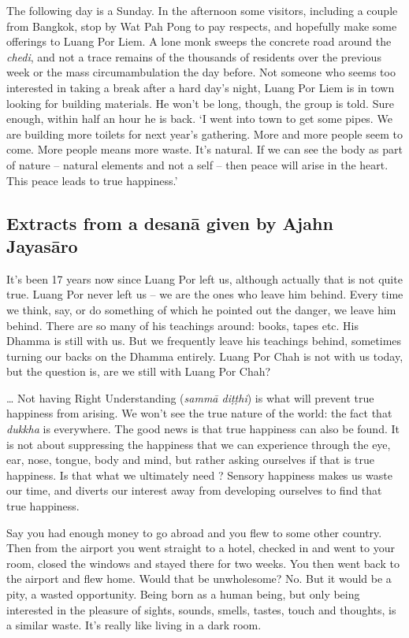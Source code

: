 The following day is a Sunday. In the afternoon some visitors, including
a couple from Bangkok, stop by Wat Pah Pong to pay respects, and
hopefully make some offerings to Luang Por Liem. A lone monk sweeps the
concrete road around the \emph{chedi}, and not a trace remains of the
thousands of residents over the previous week or the mass
circumambulation the day before. Not someone who seems too interested in
taking a break after a hard day's night, Luang Por Liem is in town
looking for building materials. He won't be long, though, the group is
told. Sure enough, within half an hour he is back. `I went into town to
get some pipes. We are building more toilets for next year's gathering. 
More and more people seem to come. More people means more waste. It's
natural. If we can see the body as part of nature -- natural elements
and not a self -- then peace will arise in the heart. This peace leads
to true happiness.'

\subsection*{Extracts from a desanā given by Ajahn Jayasāro}

It's been 17 years now since Luang Por left us, although actually
that is not quite true. Luang Por never left us -- we are the ones who
leave him behind. Every time we think, say, or do something of which he
pointed out the danger, we leave him behind. There are so many of his
teachings around: books, tapes etc. His Dhamma is still with us. But we
frequently leave his teachings behind, sometimes turning our backs on
the Dhamma entirely. Luang Por Chah is not with us today, but the
question is, are we still with Luang Por Chah? 

\ldots{} Not having Right Understanding (\emph{sammā diṭṭhi}) is what
will prevent true happiness from arising. We won't see the true nature
of the world: the fact that \emph{dukkha} is everywhere. The good news
is that true happiness can also be found. It is not about suppressing
the happiness that we can experience through the eye, ear, nose, tongue, 
body and mind, but rather asking ourselves if that is true happiness. Is
that what we ultimately need ? Sensory happiness makes us waste our time, 
and diverts our interest away from developing ourselves to find that
true happiness. 

Say you had enough money to go abroad and you flew to some other
country. Then from the airport you went straight to a hotel, checked in
and went to your room, closed the windows and stayed there for two
weeks. You then went back to the airport and flew home. Would that be
unwholesome? No. But it would be a pity, a wasted opportunity. Being
born as a human being, but only being interested in the pleasure of
sights, sounds, smells, tastes, touch and thoughts, is a similar waste. 
It's really like living in a dark room. 

